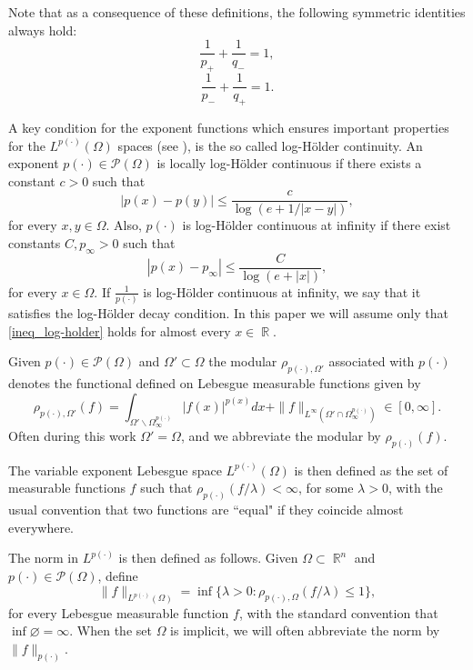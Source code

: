\documentclass[11pt,reqno]{amsart}
\theoremstyle{definition}
\theoremstyle{definition}
\theoremstyle{definition}
\DeclareMathOperator{\R}{\mathbb{R}}
\newcommand{\p}{p(\cdot)}
\begin{document}
Note that as a consequence of these definitions, the following symmetric identities always hold:
\begin{equation*}
    \frac{1}{p_{+}}+\frac{1}{q_{-}}=1,
\end{equation*}
\begin{equation*}
     \frac{1}{p_{-}}+\frac{1}{q_{+}}=1.
\end{equation*}
    
A key condition for the exponent functions which ensures important properties for the $L^{\p}(\Omega)$ spaces (see \cite{heat_equation,log-2019,key-estimate}), is the so called log-Hölder continuity. An exponent $\p\in\mathcal{P}(\Omega)$ is locally log-Hölder continuous if  there exists a constant $c>0$ such that
\begin{equation*}
    |p(x)-p(y)|\leq \frac{c}{\log(e+1/|x-y|)},
\end{equation*}
for every $x,y\in\Omega$. Also, $\p$ is log-Hölder continuous at infinity if there exist constants $C,p_{\infty}>0$ such that
\begin{equation}\label{ineq_log-holder}
    |p(x)-p_{\infty}|\leq \frac{C}{\log(e+|x|)},
\end{equation}
for every $x\in\Omega$. If $\frac{1}{\p}$ is log-Hölder continuous at infinity, we say that it satisfies the log-Hölder decay condition.  In this paper we will assume only that \eqref{ineq_log-holder} holds for almost every $x\in\R$.

Given $\p \in \mathcal{P}(\Omega)$ and  $\Omega'\subset\Omega$ the modular $\rho_{\p,\Omega'}$ associated with $\p$ denotes the functional defined on Lebesgue measurable functions given by
\begin{equation*}
    \rho_{\p,\Omega'}(f)=\int_{\Omega'\backslash\Omega_\infty^{\p}}|f(x)|^{p(x)}dx+\|f\|_{L^{\infty}(\Omega'\cap \Omega_\infty^{\p})}\in [0,\infty].
\end{equation*}
Often during this work $\Omega'=\Omega$, and we abbreviate the modular by $\rho_{\p}(f)$.

The variable exponent Lebesgue space $L^{\p}(\Omega)$ is then defined as the set of measurable functions $f$ such that $\rho_{\p}(f/\lambda)<\infty$, for some $\lambda>0$, with the usual convention that two functions are ``equal" if they coincide almost everywhere.

The norm in $L^{\p}$ is then defined as follows. Given $\Omega\subset\R^n$ and $\p\in\mathcal{P}(\Omega)$, define
\begin{equation*}
    \|f\|_{L^{\p}(\Omega)}=\inf\{\lambda>0:\rho_{\p,\Omega}(f/\lambda)\leq 1\},
\end{equation*}
for every Lebesgue measurable function $f$, with the standard convention that $\inf\varnothing=\infty$. When the set $\Omega$ is implicit, we will often abbreviate the norm by $\|f\|_{\p}$.
\end{document}

